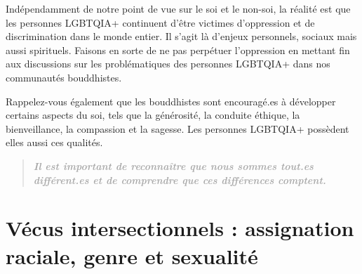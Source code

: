\documentclass[12pt,openany]{book}
\begin{document}
Indépendamment de notre point de vue sur le soi et le non-soi, la réalité est que les personnes \mbox{LGBTQIA+} continuent d’être victimes d’oppression et de discrimination dans le monde entier. Il s’agit là d’enjeux personnels, sociaux mais aussi spirituels. Faisons en sorte de ne pas perpétuer l’oppression en mettant fin aux discussions sur les problématiques des personnes \mbox{LGBTQIA+} dans nos communautés bouddhistes.

Rappelez-vous également que les bouddhistes sont encouragé.es à développer certains aspects du soi, tels que la générosité, la conduite éthique, la bienveillance, la compassion et la sagesse. Les personnes \mbox{LGBTQIA+} possèdent elles aussi ces qualités.

\begingroup
\begin{figure}[h]
    \centering
\end{figure}
\addtolength\leftmargin{-0.1in}
\begin{quote}
\doublespacing
\centering
\textit{\large \textbf{\textcolor{darkgray}{Il est important de reconnaître que nous sommes tout.es différent.es et de comprendre que ces différences comptent.}}}
\end{quote}
\endgroup

\newpage
{}
\section*{Vécus intersectionnels : \normalsize assignation raciale, genre et \mbox{sexualité}}
\end{document}
